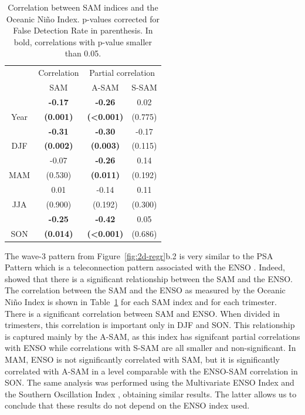 \documentclass[smallextended]{svjour3}       %
\begin{document}
\begin{table}

\caption{\label{tab:enso-cor-table}Correlation between SAM indices and the Oceanic Niño Index. p-values corrected for False Detection Rate in parenthesis. In bold, correlations with p-value smaller than 0.05.}
\centering
\begin{tabular}[t]{c>{}c>{}c>{}c}
\toprule
\multicolumn{1}{c}{ } & \multicolumn{1}{c}{Correlation} & \multicolumn{2}{c}{Partial correlation} \\
\cmidrule(l{3pt}r{3pt}){2-2} \cmidrule(l{3pt}r{3pt}){3-4}
 & SAM & A-SAM & S-SAM\\
\midrule
 & \textbf{-0.17} & \textbf{-0.26} & 0.02\\
\cmidrule{2-4}
\multirow[t]{-2}{*}{\centering\arraybackslash Year} & \textbf{(0.001)} & \textbf{(<0.001)} & (0.775)\\
\cmidrule{1-4}
 & \textbf{-0.31} & \textbf{-0.30} & -0.17\\
\cmidrule{2-4}
\multirow[t]{-2}{*}{\centering\arraybackslash DJF} & \textbf{(0.002)} & \textbf{(0.003)} & (0.115)\\
\cmidrule{1-4}
 & -0.07 & \textbf{-0.26} & 0.14\\
\cmidrule{2-4}
\multirow[t]{-2}{*}{\centering\arraybackslash MAM} & (0.530) & \textbf{(0.011)} & (0.192)\\
\cmidrule{1-4}
 & 0.01 & -0.14 & 0.11\\
\cmidrule{2-4}
\multirow[t]{-2}{*}{\centering\arraybackslash JJA} & (0.900) & (0.192) & (0.300)\\
\cmidrule{1-4}
 & \textbf{-0.25} & \textbf{-0.42} & 0.05\\
\cmidrule{2-4}
\multirow[t]{-2}{*}{\centering\arraybackslash SON} & \textbf{(0.014)} & \textbf{(<0.001)} & (0.686)\\
\bottomrule
\end{tabular}
\end{table}

The wave-3 pattern from Figure~\ref{fig:2d-regr}b.2 is very similar to the PSA Pattern \citep{mo1987, kidson1988} which is a teleconnection pattern associated with the ENSO \citep{karoly1989}.
Indeed, \citet{fogt2011} showed that there is a significant relationship between the SAM and the ENSO.
The correlation between the SAM and the ENSO as measured by the Oceanic Niño Index \citep[ONI,][]{bamston1997} is shown in Table~\ref{tab:enso-cor-table} for each SAM index and for each trimester.
There is a significant correlation between SAM and ENSO. When divided in trimesters, this correlation is important only in DJF and SON.
This relationship is captured mainly by the A\nobreakdash-SAM, as this index has signifcant partial correlations with ENSO while correlations with S\nobreakdash-SAM are all smaller and non-significant.
In MAM, ENSO is not significantly correlated with SAM, but it is significantly correlated with A\nobreakdash-SAM in a level comparable with the ENSO-SAM correlation in SON. The same analysis was performed using the Multivariate ENSO Index \citep{wolter2011} and the Southern Oscillation Index \citep{ropelewski1987}, obtaining similar results.
The latter allows us to conclude that these results do not depend on the ENSO index used.
\end{document}
